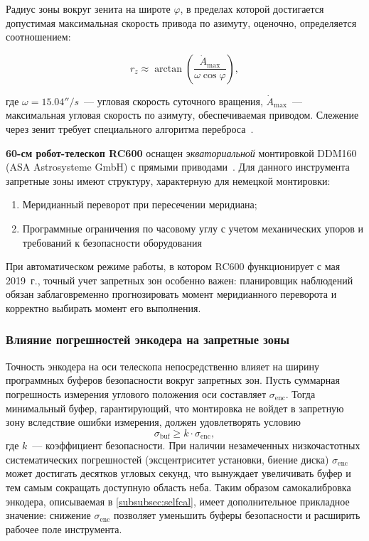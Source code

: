 Радиус зоны вокруг зенита на широте $\varphi$, в пределах которой достигается допустимая максимальная скорость привода по азимуту, оценочно, определяется соотношением:

$$
r_z \approx \arctan\left(\frac{\dot{A}_{\max}}{\omega \cos\varphi}\right),
$$

где $\omega= 15.04''/{s}$~--- угловая скорость суточного вращения, $\dot{A}_{\max}$~--- максимальная угловая скорость по азимуту, обеспечиваемая приводом. Слежение через зенит требует специального алгоритма переброса~\cite{TPoint_Wallace}.

\textbf{60-см робот-телескоп RC600} оснащен \textit{экваториальной} монтировкой DDM160 (ASA Astrosysteme GmbH) с прямыми приводами~\cite{Shatsky2020}. Для данного инструмента запретные зоны имеют структуру, характерную для немецкой монтировки:

\begin{enumerate}
    \item Меридианный переворот при пересечении меридиана;
    \item Программные ограничения по часовому углу с учетом механических упоров и требований к безопасности оборудования
\end{enumerate}

При автоматическом режиме работы, в котором RC600 функционирует с мая 2019~г., точный учет запретных зон особенно важен: планировщик наблюдений обязан заблаговременно прогнозировать момент меридианного переворота и корректно выбирать момент его выполнения.

\subsubsection{Влияние погрешностей энкодера на запретные зоны}
\label{subsec:encoder_forbidden}

Точность энкодера на оси телескопа непосредственно влияет на ширину программных буферов безопасности вокруг запретных зон. Пусть суммарная погрешность измерения углового положения оси составляет $\sigma_{\mathrm{enc}}$. Тогда минимальный буфер, гарантирующий, что монтировка не войдет в запретную зону вследствие ошибки измерения, должен удовлетворять условию
\[
\sigma_{\mathrm{buf}} \geq k \cdot \sigma_{\mathrm{enc}},
\]
где $k$~--- коэффициент безопасности. При наличии незамеченных низкочастотных систематических погрешностей (эксцентриситет установки, биение диска) $\sigma_{\mathrm{enc}}$ может достигать десятков угловых секунд, что вынуждает увеличивать буфер и тем самым сокращать доступную область неба. Таким образом самокалибровка энкодера, описываемая в \ref{subsubsec:selfcal}, имеет дополнительное прикладное значение: снижение $\sigma_{\mathrm{enc}}$ позволяет уменьшить буферы безопасности и расширить рабочее поле инструмента.

